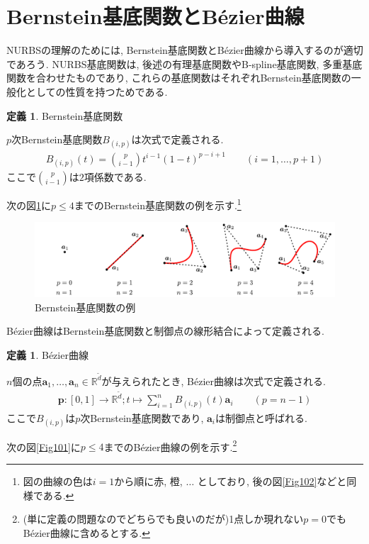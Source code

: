 \documentclass{jsarticle}
\newcommand\setR{\mathbb{R}}
\newcommand\nCr[2]{\binom{#1}{#2}}
\theoremstyle{definition}%
\newtheorem{defn}[thm]{定義}
\begin{document}
\section{Bernstein基底関数とB\'{e}zier曲線}
NURBSの理解のためには, Bernstein基底関数とB\'{e}zier曲線から導入するのが適切であろう.
NURBS基底関数は, 後述の有理基底関数やB-spline基底関数, 多重基底関数を合わせたものであり, これらの基底関数はそれぞれBernstein基底関数の一般化としての性質を持つためである.
\begin{screen}
	\begin{defn}
        \label{Def101}
		Bernstein基底関数

		$p$次Bernstein基底関数$B_{(i,p)}$は次式で定義される.
		\begin{align}
			\label{Eqn101}
			B_{(i,p)}(t)=\nCr{p}{i-1}t^{i-1}(1-t)^{p-i+1} \qquad (i=1,\dots,p+1)
		\end{align}
		ここで$\nCr{p}{i-1}$は$2$項係数である.
	\end{defn}
\end{screen}
次の図\ref{Fig104}に$p\le 4$までのBernstein基底関数の例を示す.\footnote{図の曲線の色は$i=1$から順に赤, 橙, $\dots$ としており, 後の図\ref{Fig102}などと同様である.}
\addtocounter{footnote}{-1}
\begin{figure}[H]
	\centering
    \includegraphics[page=10,clip,width=160mm]{fig.pdf}
	\caption{Bernstein基底関数の例\protect\footnotemark}
	\label{Fig104}
\end{figure}
B\'{e}zier曲線はBernstein基底関数と制御点の線形結合によって定義される.
\begin{screen}
	\begin{defn}
		B\'ezier曲線

		$n$個の点$\bm{a}_1, \dots, \bm{a}_n\in\mathbb{R}^{\tilde{d}}$が与えられたとき, B\'ezier曲線は次式で定義される.
		\begin{align}
			\label{Eqn102}
			\bm{p}:[0,1]\to \setR^{\tilde{d}};t\mapsto \sum_{i=1}^nB_{(i,p)}(t)\bm{a}_i \qquad (p=n-1)
		\end{align}
        ここで$B_{(i,p)}$は$p$次Bernstein基底関数であり, $\bm{a}_i$は制御点と呼ばれる.
	\end{defn}
\end{screen}
次の図\ref{Fig101}に$p\le 4$までのB\'ezier曲線の例を示す.\footnote{(単に定義の問題なのでどちらでも良いのだが)1点しか現れない$p=0$でもB\'{e}zier曲線に含めるとする.}
\newpage
\end{document}
